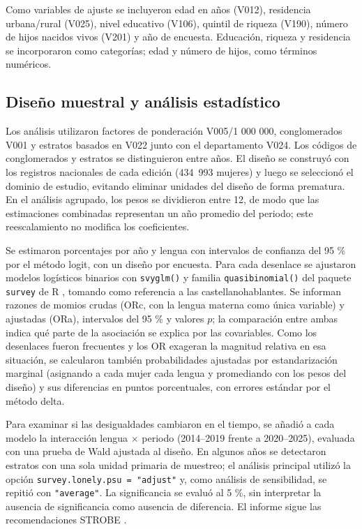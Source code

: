 \documentclass[
  spanish,
  letterpaper,
  conference]{IEEEtran}
\begin{document}
Como variables de ajuste se incluyeron edad en años (V012), residencia
urbana/rural (V025), nivel educativo (V106), quintil de riqueza (V190),
número de hijos nacidos vivos (V201) y año de encuesta. Educación,
riqueza y residencia se incorporaron como categorías; edad y número de
hijos, como términos numéricos.

\subsection{Diseño muestral y análisis
estadístico}\label{diseuxf1o-muestral-y-anuxe1lisis-estaduxedstico}

Los análisis utilizaron factores de ponderación V005/1 000 000,
conglomerados V001 y estratos basados en V022 junto con el departamento
V024. Los códigos de conglomerados y estratos se distinguieron entre
años. El diseño se construyó con los registros nacionales de cada
edición (434~993 mujeres) y luego se seleccionó el dominio de estudio,
evitando eliminar unidades del diseño de forma prematura. En el análisis
agrupado, los pesos se dividieron entre 12, de modo que las estimaciones
combinadas representan un año promedio del periodo; este reescalamiento
no modifica los coeficientes.

Se estimaron porcentajes por año y lengua con intervalos de confianza
del 95 \% por el método logit, con un diseño por encuesta. Para cada
desenlace se ajustaron modelos logísticos binarios con \texttt{svyglm()}
y familia \texttt{quasibinomial()} del paquete \texttt{survey} de R
\citep{lumley2004, rcore}, tomando como referencia a las
castellanohablantes. Se informan razones de momios crudas (ORc, con la
lengua materna como única variable) y ajustadas (ORa), intervalos del 95
\% y valores \(p\); la comparación entre ambas indica qué parte de la
asociación se explica por las covariables. Como los desenlaces fueron
frecuentes y los OR exageran la magnitud relativa en esa situación, se
calcularon también probabilidades ajustadas por estandarización marginal
(asignando a cada mujer cada lengua y promediando con los pesos del
diseño) y sus diferencias en puntos porcentuales, con errores estándar
por el método delta.

Para examinar si las desigualdades cambiaron en el tiempo, se añadió a
cada modelo la interacción lengua \(\times\) periodo (2014--2019 frente
a 2020--2025), evaluada con una prueba de Wald ajustada al diseño. En
algunos años se detectaron estratos con una sola unidad primaria de
muestreo; el análisis principal utilizó la opción
\texttt{survey.lonely.psu\ =\ "adjust"} y, como análisis de
sensibilidad, se repitió con \texttt{"average"}. La significancia se
evaluó al 5 \%, sin interpretar la ausencia de significancia como
ausencia de diferencia. El informe sigue las recomendaciones STROBE
\citep{vonelm2007, vandenbroucke2007}.
\end{document}
